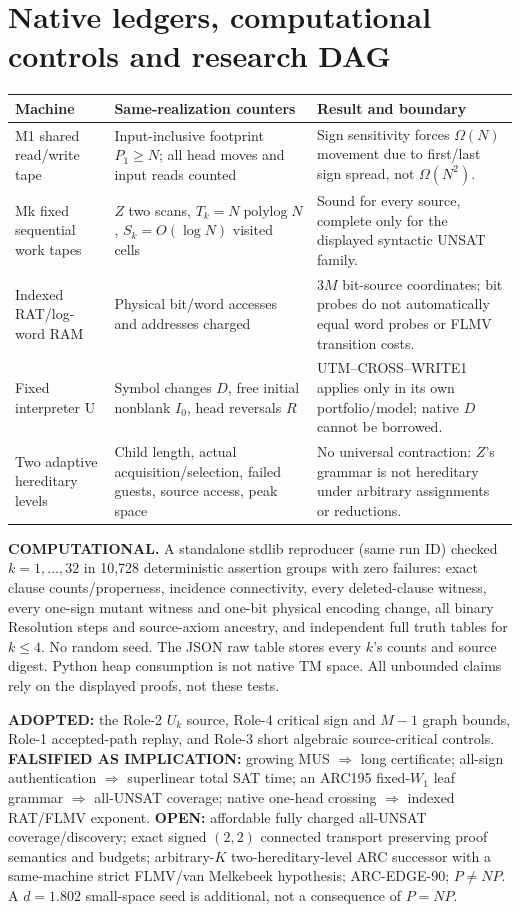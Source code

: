 \documentclass[11pt]{article}
\begin{document}
\section{Native ledgers, computational controls and research DAG}
\begin{center}\small
\begin{tabularx}{.98\linewidth}{p{.16\linewidth}p{.35\linewidth}X}\toprule
Machine & Same-realization counters & Result and boundary\\\midrule
M1 shared read/write tape & Input-inclusive footprint \(P_1\ge N\); all head moves and input reads counted & Sign sensitivity forces \(\Omega(N)\) movement due to first/last sign spread, not \(\Omega(N^2)\).\\
Mk fixed sequential work tapes & \(Z\) two scans, \(T_k=N\operatorname{polylog}N\), \(S_k=O(\log N)\) visited cells & Sound for every source, complete only for the displayed syntactic UNSAT family.\\
Indexed RAT/log-word RAM & Physical bit/word accesses and addresses charged & \(3M\) bit-source coordinates; bit probes do not automatically equal word probes or FLMV transition costs.\\
Fixed interpreter U & Symbol changes \(D\), free initial nonblank \(I_0\), head reversals \(R\) & UTM--CROSS--WRITE1 applies only in its own portfolio/model; native \(D\) cannot be borrowed.\\
Two adaptive hereditary levels & Child length, actual acquisition/selection, failed guests, source access, peak space & No universal contraction: \(Z\)'s grammar is not hereditary under arbitrary assignments or reductions.\\\bottomrule
\end{tabularx}
\end{center}
\textbf{COMPUTATIONAL.} A standalone stdlib reproducer (same run ID) checked \(k=1,\ldots,32\) in 10,728 deterministic assertion groups with zero failures: exact clause counts/properness, incidence connectivity, every deleted-clause witness, every one-sign mutant witness and one-bit physical encoding change, all binary Resolution steps and source-axiom ancestry, and independent full truth tables for \(k\le4\). No random seed. The JSON raw table stores every \(k\)'s counts and source digest. Python heap consumption is not native TM space. All unbounded claims rely on the displayed proofs, not these tests.

\textbf{ADOPTED:} the Role-2 \(U_k\) source, Role-4 critical sign and \(M-1\) graph bounds, Role-1 accepted-path replay, and Role-3 short algebraic source-critical controls.
\textbf{FALSIFIED AS IMPLICATION:} growing MUS \(\Rightarrow\) long certificate; all-sign authentication \(\Rightarrow\) superlinear total SAT time; an ARC195 fixed-\(W_1\) leaf grammar \(\Rightarrow\) all-UNSAT coverage; native one-head crossing \(\Rightarrow\) indexed RAT/FLMV exponent.
\textbf{OPEN:} affordable fully charged all-UNSAT coverage/discovery; exact signed \((2,2)\) connected transport preserving proof semantics and budgets; arbitrary-\(K\) two-hereditary-level ARC successor with a same-machine strict FLMV/van Melkebeek hypothesis; ARC-EDGE-90; \(P\ne NP\). A \(d=1.802\) small-space seed is additional, not a consequence of \(P=NP\).
\end{document}
